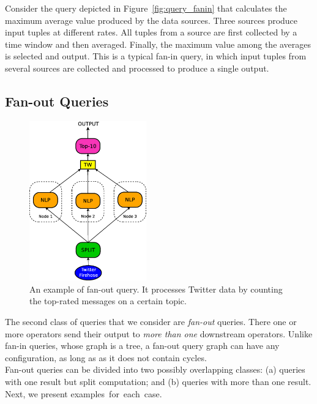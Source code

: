 \ex Consider the query depicted in Figure~\ref{fig:query_fanin} that calculates
the maximum average value produced by the data sources.
Three sources produce input tuples at different rates. All tuples from a source are first
collected by a time window and then averaged. Finally, the maximum value among the
averages is selected and output. This is a typical fan-in query, in which input tuples from several
sources are collected and processed to produce a single output.

\subsection*{Fan-out Queries} 
\label{sec:fan-out}

\begin{figure}[b!]
	\centering
	\includegraphics[width=0.45\textwidth]{img/tesi/fan-out_mr_senza} 
	\caption{An example of fan-out query. It processes Twitter data by counting the top-rated messages on a
	certain topic.}
	\label{fig:fanout_mr}
\end{figure}

The second class of queries that we consider are \textit{fan-out} queries. There one or more operators
send their output to \textit{more than one} downstream operators.
Unlike fan-in queries, whose graph is a tree, a fan-out query
graph can have any configuration, as long as as it does not contain cycles.\\
Fan-out queries can be divided into two possibly overlapping classes: (a) queries with one
result but split computation; and (b) queries with more than one result. Next, we present
examples~for~each~case.

